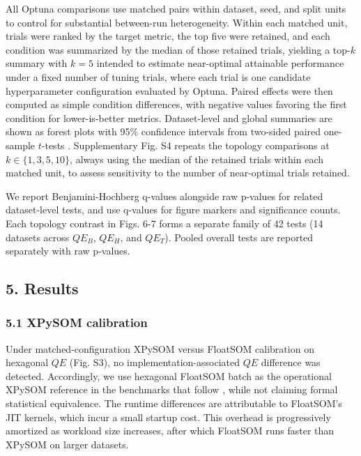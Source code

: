 \documentclass[
]{article}
\providecommand{\DIFadd}[1]{{\protect\color{blue} #1}} %
\providecommand{\DIFaddbegin}{} %
\providecommand{\DIFaddend}{} %
\begin{document}
All Optuna comparisons use matched pairs within dataset, seed, and split
units to control for substantial between-run heterogeneity. Within each
matched unit, trials were ranked by the target metric, the top five were
retained, and each condition was summarized by the median of those
retained trials, yielding a top-\(k\) summary with \(k=5\) intended to
estimate near-optimal attainable performance under a fixed number of
tuning trials, where each trial is one candidate hyperparameter
configuration evaluated by Optuna. Paired effects were then computed as
simple condition differences, with negative values favoring the first
condition for lower-is-better metrics. Dataset-level and global
summaries are shown as forest plots with 95\% confidence intervals from
two-sided paired one-sample \(t\)-tests \DIFaddbegin \DIFadd{. Supplementary Fig. S4 repeats
the topology comparisons at \(k\in\{1,3,5,10\}\), always using the
median of the retained trials within each matched unit, to assess
sensitivity to the number of near-optimal trials retained}\DIFaddend .

\DIFaddbegin \DIFadd{We report Benjamini-Hochberg q-values alongside raw p-values for related
dataset-level tests, and use q-values for figure markers and
significance counts. Each topology contrast in Figs. 6-7 forms a
separate family of 42 tests (14 datasets across \(QE_B\), \(QE_H\), and
\(QE_T\)). Pooled overall tests are reported separately with raw
p-values.
}

\DIFaddend \subsection{5. Results}\label{results}

\subsubsection{5.1 XPySOM calibration } \DIFaddbegin \label{xpysom-calibration}
\DIFaddend

Under matched-configuration XPySOM versus FloatSOM calibration on
hexagonal \(QE\) (Fig. S3),  \DIFaddbegin \DIFadd{no implementation-associated }\DIFaddend \(QE\)
 \DIFaddbegin \DIFadd{difference was detected}\DIFaddend . Accordingly, we  \DIFaddbegin \DIFadd{use }\DIFaddend hexagonal FloatSOM batch as
 \DIFaddbegin \DIFadd{the operational XPySOM reference }\DIFaddend in the benchmarks that follow\DIFaddbegin \DIFadd{, while
not claiming formal statistical equivalence}\DIFaddend . The runtime differences are
attributable to FloatSOM's JIT kernels, which incur a small startup
cost. This overhead is progressively amortized as workload size
increases, after which FloatSOM runs faster than XPySOM on larger
datasets.
\end{document}
